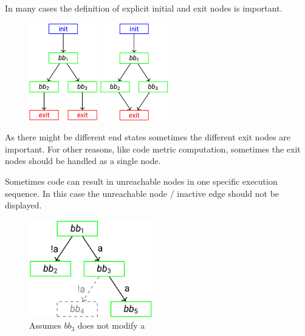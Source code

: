 \documentclass[
../../Software_Engineering_Summary.tex,
]
{subfiles}
\begin{document}
In many cases the definition of explicit initial and exit nodes is important.

\begin{figure}[htp]
    \begin{minipage}
        [t]{0.47\textwidth}
        \centering
        \includegraphics[height=120pt]{Pics/06/ExampleCFGInitialExit.png}
    \end{minipage}
    \hfill
    \begin{minipage}
        [t]{0.47\textwidth}
        \centering
        \includegraphics[height=120pt]{Pics/06/ExampleCFGSingleExit.png}
    \end{minipage}
\end{figure}

As there might be different end states sometimes the different exit nodes are important. For other reasons, like code metric computation, sometimes the exit nodes should be handled as a single node.

Sometimes code can result in unreachable nodes in one specific execution sequence. In this case the unreachable node / inactive edge should not be displayed.

\begin{figure}
    [htp]
    \centering
    \includegraphics[height=120pt]{Pics/06/ExampleCFGInactiveEdges.png}
    \caption{Assumes $bb_3$ does not modify a}
\end{figure}
\end{document}
